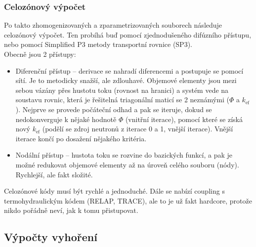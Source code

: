 \subsubsection{Celozónový výpočet}

Po takto zhomogenizovaných a zparametrizovaných souborech následuje celozónový výpočet. Ten probíhá buď pomocí zjednodušeného difúzního přístupu, nebo pomocí Simplified P3 metody transportní rovnice (SP3).\\

Obecně jsou 2 přístupy:

\begin{itemize}
  \item Diferenční přístup -- derivace se nahradí diferencemi a postupuje se pomocí sítí. Je to metodicky snažší, ale zdlouhavé. Objemové elementy jsou mezi sebou vázány přes hustotu toku (rovnost na hranici) a systém vede na soustavu rovnic, která je řešitelná triagonální maticí se 2 neznámými ($\Phi$ a $k_\text{ef}$). Nejprve se provede počáteční odhad a pak se iteruje, dokud se nedokonverguje k nějaké hodnotě $\Phi$ (vnitřní iterace), pomocí které se získá nový $k_\text{ef}$ (podělí se zdroj neutronů z iterace 0 a 1, vnější iterace). Vnější iterace končí po dosažení nějakého kritéria.
  \item Nodální přístup -- hustota toku se rozvine do bazických funkcí, a pak je možné redukovat objemové elementy až na úroveň celého souboru (nódy). Rychlejší, ale fakt složité.
\end{itemize}

Celozónové kódy musí být rychlé a jednoduché. Dále se nabízí coupling s termohydraulickým kódem (RELAP, TRACE), ale to je už fakt hardcore, protože nikdo pořádně neví, jak k tomu přistupovat.

\subsection{Výpočty vyhoření}